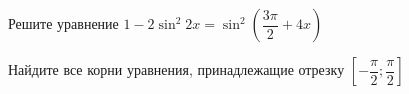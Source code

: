 \begin{ex}
	\begin{condition}
		\begin{enumcols}[label=\asbuk*)]
			\item Решите уравнение \(  1 - 2\sin^2 2x = \sin^2{\left(\dfrac{3\pi}{2}+4x\right)} \)
			\item Найдите все корни уравнения, принадлежащие отрезку \( \left[-\dfrac{\pi}{2};\dfrac{\pi}{2}\right] \)
		\end{enumcols}
	\end{condition}
\end{ex}